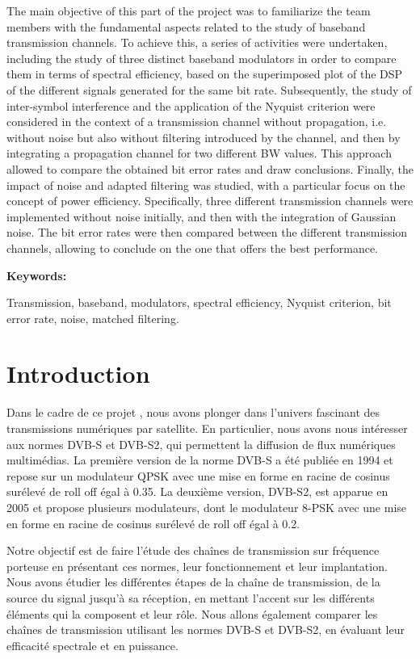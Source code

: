 \documentclass[11pt]{article}
\begin{document}
The main objective of this part of the project was to familiarize the team members with the fundamental aspects related to the study of baseband transmission channels. To achieve this, a series of activities were undertaken, including the study of three distinct baseband modulators in order to compare them in terms of spectral efficiency, based on the superimposed plot of the DSP of the different signals generated for the same bit rate. Subsequently, the study of inter-symbol interference and the application of the Nyquist criterion were considered in the context of a transmission channel without propagation, i.e. without noise but also without filtering introduced by the channel, and then by integrating a propagation channel for two different BW values. This approach allowed to compare the obtained bit error rates and draw conclusions. Finally, the impact of noise and adapted filtering was studied, with a particular focus on the concept of power efficiency. Specifically, three different transmission channels were implemented without noise initially, and then with the integration of Gaussian noise. The bit error rates were then compared between the different transmission channels, allowing to conclude on the one that offers the best performance.

{\bfseries Keywords:}

Transmission, baseband, modulators, spectral efficiency, Nyquist criterion, bit error rate, noise, matched filtering.

\newpage
\tableofcontents
\listoffigures

\newpage
\section{Introduction}

Dans le cadre de ce projet , nous avons plonger dans l'univers fascinant des transmissions numériques par satellite. En particulier, nous avons nous intéresser aux normes DVB-S et DVB-S2, qui permettent la diffusion de flux numériques multimédias. La première version de la norme DVB-S a été publiée en 1994 et repose sur un modulateur QPSK avec une mise en forme en racine de cosinus surélevé de roll off égal à 0.35. La deuxième version, DVB-S2, est apparue en 2005 et propose plusieurs modulateurs, dont le modulateur 8-PSK avec une mise en forme en racine de cosinus surélevé de roll off égal à 0.2.

Notre objectif est de faire l'étude des chaînes de transmission sur fréquence porteuse en présentant ces normes, leur fonctionnement et leur implantation. Nous avons étudier les différentes étapes de la chaîne de transmission, de la source du signal jusqu'à sa réception, en mettant l'accent sur les différents éléments qui la composent et leur rôle. Nous allons également comparer les chaînes de transmission utilisant les normes DVB-S et DVB-S2, en évaluant leur efficacité spectrale et en puissance.
\end{document}
